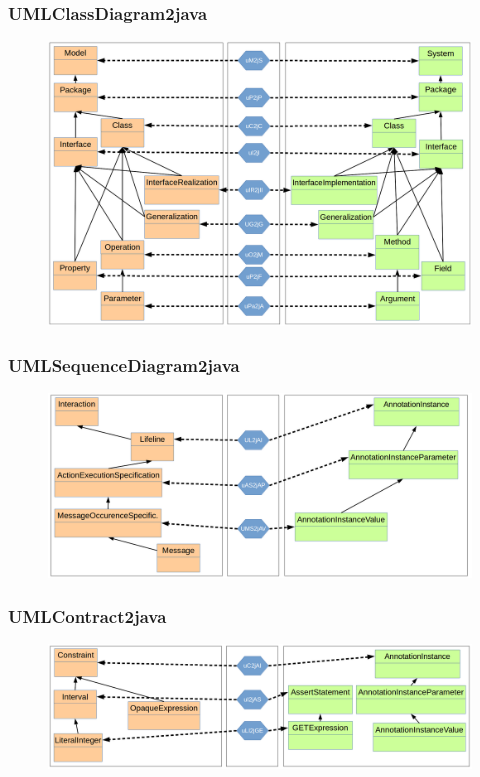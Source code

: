 \documentclass{beamer}
\begin{document}
\begin{frame}
	\frametitle{UMLClassDiagram2java}
	\begin{figure}
		\includegraphics[width=.8\textwidth]{umlClassDiagram2java_type}
	\end{figure}
\end{frame}

\begin{frame}
	\frametitle{UMLSequenceDiagram2java}
	\begin{figure}
		\includegraphics[width=.8\textwidth]{umlSequenceDiagram2java_type}
	\end{figure}
\end{frame}

\begin{frame}
	\frametitle{UMLContract2java}
	\begin{figure}
		\includegraphics[width=.8\textwidth]{umlContract2java_type}
	\end{figure}
\end{frame}

\end{document}
